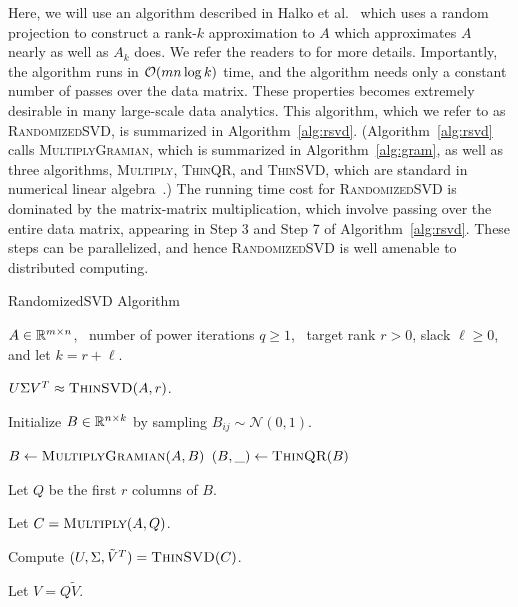 Here, we will use an algorithm described in Halko et al.~\cite{HMT09_SIREV}
which uses a random projection to construct a rank-$k$ approximation to $A$
which approximates $A$ nearly as well as $A_k$ does.  We refer the readers to
\cite{HMT09_SIREV,Mah-mat-rev_BOOK} for more details.  Importantly, the
algorithm runs in $\operatorname{\mathcal{O}}(mn \log k)$ time, and the algorithm needs only a
constant number of passes over the data matrix.  These properties becomes
extremely desirable in many large-scale data analytics.  This algorithm, which
we refer to as \textsc{RandomizedSVD}, is summarized in
Algorithm~\ref{alg:rsvd}.  (Algorithm~\ref{alg:rsvd} calls
\textsc{MultiplyGramian}, which is summarized in Algorithm~\ref{alg:gram}, as
well as three algorithms, \textsc{Multiply}, \textsc{ThinQR}, and
\textsc{ThinSVD}, which are standard in numerical linear algebra~\cite{GVL96}.)
The running time cost for \textsc{RandomizedSVD} is dominated by the
matrix-matrix multiplication, which involve passing over the entire data
matrix, appearing in Step 3 and Step 7 of Algorithm~\ref{alg:rsvd}.  
These steps can be parallelized, and hence \textsc{RandomizedSVD} is well
amenable to distributed computing.


\begin{algorithm}[tb]
 \caption{{\sc RandomizedSVD} Algorithm}
  \label{alg:rsvd}
  \begin{algorithmic}[1]
    \Require $A \in \mathbb{R}^{m\times n}$, \
      number of power iterations $q \ge 1$, \
      target rank $r > 0$, slack $\ell \ge 0$, and let $k=r+\ell$.

    \Ensure $U \Sigma V^T \approx \Call{ThinSVD}{A, r}$.

    \State Initialize $B \in \mathbb{R}^{n\times k}$ by sampling $B_{ij} \sim \mathcal{N}(0, 1)$.

    \For{$q$ times}
        \State $B \gets \Call{MultiplyGramian}{A, B}$
        \State $(B, \_) \gets \Call{ThinQR}{B}$
    \EndFor

    \State Let $Q$ be the first $r$ columns of $B$.

    \State Let $C = \Call{Multiply}{A, Q}$.

    \State Compute $(U, \Sigma, \tilde V^T) = \Call{ThinSVD}{C}$.

    \State Let $V = Q \tilde V$.

    \end{algorithmic}
\end{algorithm}

